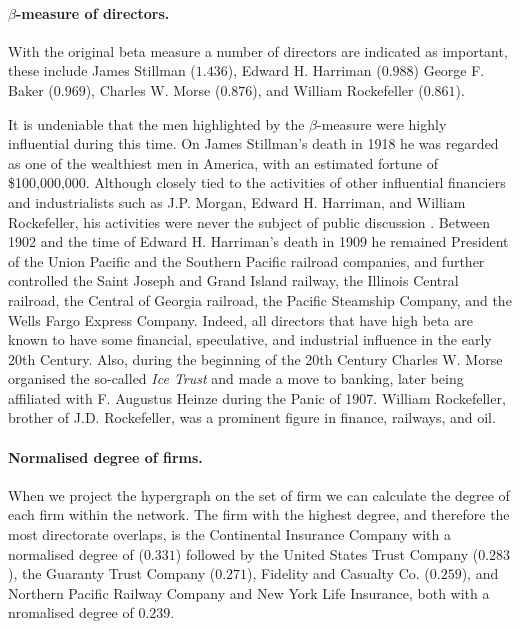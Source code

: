 \documentclass[11pt,fleqn]{article}
\begin{document}
\paragraph{$\beta$-measure of directors.}

With the original beta measure a number of directors are indicated as important, these include James Stillman ($1.436$), Edward H. Harriman ($0.988$) George F. Baker ($0.969$), Charles W. Morse ($0.876$), and William Rockefeller ($0.861$).

It is undeniable that the men highlighted by the $\beta$-measure were highly influential during this time. On James Stillman's death in 1918 he was regarded as one of the wealthiest men in America, with an estimated fortune of \$100,000,000. Although closely tied to the activities of other influential financiers and industrialists such as J.P. Morgan, Edward H. Harriman, and William Rockefeller, his activities were never the subject of public discussion \citep{NYT1918Stillman}. Between 1902 and the time of Edward H. Harriman's death in 1909 he remained President of the Union Pacific and the Southern Pacific railroad companies, and further controlled the Saint Joseph and Grand Island railway, the Illinois Central railroad, the Central of Georgia railroad, the Pacific Steamship Company, and the Wells Fargo Express Company. Indeed, all directors that have high beta are known to have some financial, speculative, and industrial influence in the early 20th Century. Also, during the beginning of the 20th Century Charles W. Morse organised the so-called \emph{Ice Trust} and made a move to banking, later being affiliated with F. Augustus Heinze during the Panic of 1907. William Rockefeller, brother of J.D. Rockefeller, was a prominent figure in finance, railways, and oil.

\paragraph{Normalised degree of firms.}

When we project the hypergraph on the set of firm we can calculate the degree of each firm within the network. The firm with the highest degree, and therefore the most directorate overlaps, is the Continental Insurance Company with a normalised degree of ($0.331$) followed by the United States Trust Company ($0.283$), the Guaranty Trust Company ($0.271$), Fidelity and Casualty Co. ($0.259$), and Northern Pacific Railway Company and New York Life Insurance, both with a nromalised degree of $0.239$.
\end{document}
